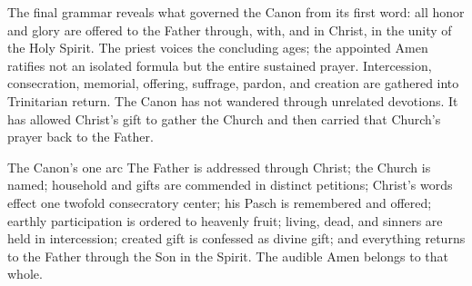 The final grammar reveals what governed the Canon from its first word: all honor and glory are offered to the Father through, with, and in Christ, in the unity of the Holy Spirit. The priest voices the concluding ages; the appointed Amen ratifies not an isolated formula but the entire sustained prayer. Intercession, consecration, memorial, offering, suffrage, pardon, and creation are gathered into Trinitarian return. The Canon has not wandered through unrelated devotions. It has allowed Christ's gift to gather the Church and then carried that Church's prayer back to the Father.

\begin{studybox}{The Canon's one arc}
The Father is addressed through Christ; the Church is named; household and gifts are commended in distinct petitions; Christ's words effect one twofold consecratory center; his Pasch is remembered and offered; earthly participation is ordered to heavenly fruit; living, dead, and sinners are held in intercession; created gift is confessed as divine gift; and everything returns to the Father through the Son in the Spirit. The audible Amen belongs to that whole.
\end{studybox}
